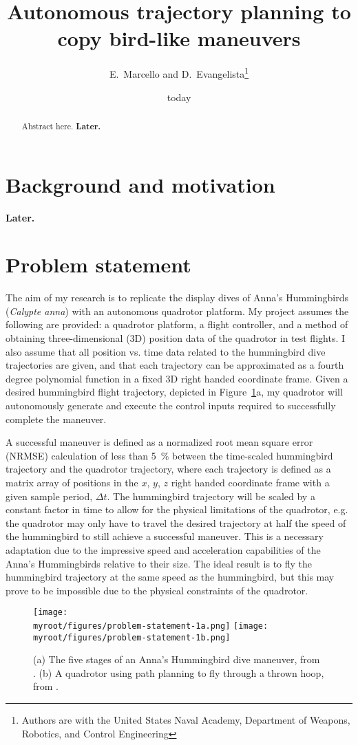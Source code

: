 \documentclass[onecolumn,10pt]{IEEEtran}
\title{Autonomous trajectory planning to copy bird-like maneuvers}
\author{E.~Marcello and D.~Evangelista\thanks{Authors are with the United States Naval Academy, Department of Weapons, Robotics, and Control Engineering}}
\date{today}
\newcommand{\myroot}{../}
\newcommand{\Later}{\textbf{Later.}}
\newcommand{\Calypteanna}{\emph{Calypte anna}}
\begin{document}
\maketitle

\begin{abstract}
Abstract here. \Later
\end{abstract}

\section{Background and motivation}
\Later

\section{Problem statement}
The aim of my research is to replicate the display dives of Anna’s Hummingbirds (\Calypteanna) with an autonomous quadrotor platform. My project assumes the following are provided: a quadrotor platform, a flight controller, and a method of obtaining three-dimensional (3D) position data of the quadrotor in test flights. I also assume that all position vs. time data related to the hummingbird dive trajectories are given, and that each trajectory can be approximated as a fourth degree polynomial function in a fixed 3D right handed coordinate frame. Given a desired hummingbird flight trajectory, depicted in Figure~\ref{fig-problem-statement-1}a, my quadrotor will autonomously generate and execute the control inputs required to successfully complete the maneuver. 

A successful maneuver is defined as a normalized root mean square error (NRMSE) calculation of less than \SI{5}{\percent} between the time-scaled hummingbird trajectory and the quadrotor trajectory, where each trajectory is defined as a matrix array of positions in the $x$, $y$, $z$ right handed coordinate frame with a given sample period, $\Delta t$. The hummingbird trajectory will be scaled by a constant factor in time to allow for the physical limitations of the quadrotor, e.g. the quadrotor may only have to travel the desired trajectory at half the speed of the hummingbird to still achieve a successful maneuver. This is a necessary adaptation due to the impressive speed and acceleration capabilities of the Anna’s Hummingbirds relative to their size\cite{clark2009courtship}. The ideal result is to fly the hummingbird trajectory at the same speed as the hummingbird, but this may prove to be impossible due to the physical constraints of the quadrotor.\begin{figure}[h]
\begin{center}
\texttt{[image: \\myroot/figures/problem-statement-1a.png]}%
\texttt{[image: \\myroot/figures/problem-statement-1b.png]}
\end{center}
\caption{(a) The five stages of an Anna’s Hummingbird dive maneuver, from \cite{clark2009courtship}. (b) A quadrotor using path planning to fly through a thrown hoop, from \cite{mellinger2011minimum}.}
\label{fig-problem-statement-1}
\end{figure}
\end{document}
